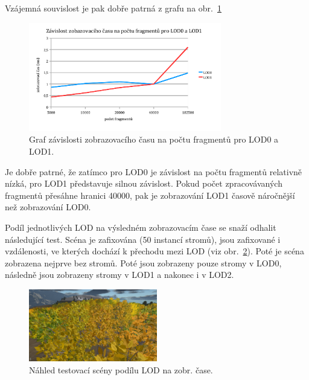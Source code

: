 Vzájemná souvislost je pak dobře patrná z grafu na obr.~\ref{fig:testFRAG01}
\begin{figure}[!hbt]
\begin{center}
\includegraphics[width=0.75\textwidth]{./graphs/fragLOD01.png}
\end{center}
\caption[Graf závislosti zobrazovacího času na počtu fragmentů pro LOD0 a LOD1]%
{Graf závislosti zobrazovacího času na počtu fragmentů pro LOD0 a LOD1.\label{fig:testFRAG01}
}
\end{figure}

Je dobře patrné, že zatímco pro LOD0 je závislost na počtu fragmentů relativně nízká, pro LOD1 představuje silnou závislost. Pokud počet zpracovávaných fragmentů přesáhne hranici 40000, pak je zobrazování LOD1 časově náročnější než zobrazování LOD0.

%

Podíl jednotlivých LOD na výsledném zobrazovacím čase se snaží odhalit následující test. Scéna je zafixována (50 instancí stromů), jsou zafixované i vzdálenosti, ve kterých dochází k přechodu mezi LOD (viz obr.~\ref{fig:testCONTR}). Poté je scéna zobrazena nejprve bez stromů. Poté jsou zobrazeny pouze stromy v LOD0, následně jsou zobrazeny stromy v LOD1 a nakonec i v LOD2. 
\begin{figure}[!hbt]
\begin{center}
\includegraphics[width=0.5\textwidth]{./testing/on-offLOD2.png}
\end{center}
\caption[Náhled testovací scény podílu LOD na zobr. čase]%
{Náhled testovací scény podílu LOD na zobr. čase. \label{fig:testCONTR}
}
\end{figure}

